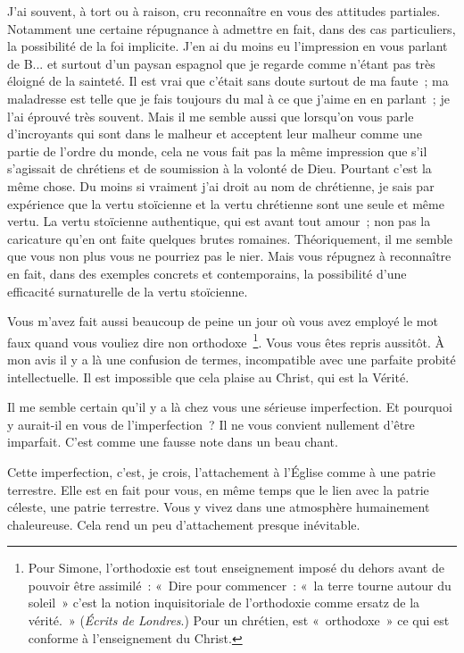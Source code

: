 \documentclass[french,twoside]{book} %
\begin{document}
J'ai souvent, à tort ou à raison, cru reconnaître en vous des attitudes partiales. Notamment une certaine répugnance à admettre en fait, dans des cas particuliers, la possibilité de la foi implicite. J'en ai du moins eu l'impression en vous parlant de B... et surtout d'un paysan espagnol que je regarde comme n'étant pas très éloigné de la sainteté. Il est vrai que c'était sans doute surtout de ma faute ; ma maladresse est telle que je fais toujours du mal à ce que j'aime en en parlant ; je l'ai éprouvé très souvent. Mais il me semble aussi que lorsqu'on vous parle d'incroyants qui sont dans le malheur et acceptent leur malheur comme une partie de l'ordre du monde, cela ne vous fait pas la même impression que s'il s'agissait de chrétiens et de soumission à la volonté de Dieu. Pourtant c'est la même chose. Du moins si vraiment j'ai droit au nom de chrétienne, je sais par expérience que la vertu stoïcienne et la vertu chrétienne sont une seule et même vertu. La vertu stoïcienne authentique, qui est avant tout amour ; non pas la caricature qu'en ont faite quelques brutes romaines. Théoriquement, il me semble que vous non plus vous ne pourriez pas le nier. Mais vous répugnez à reconnaître en fait, dans des exemples concrets et contemporains, la possibilité d'une efficacité surnaturelle de la vertu stoïcienne.\par
Vous m'avez fait aussi beaucoup de peine un jour où vous avez employé le mot faux quand vous vouliez dire non orthodoxe \footnote{ Pour Simone, l'orthodoxie est tout enseignement imposé du dehors avant de pouvoir être assimilé : « Dire pour commencer : « la terre tourne autour du soleil » c'est la notion inquisitoriale de l'orthodoxie comme ersatz de la vérité. » ({\itshape Écrits de Londres}.) Pour un chrétien, est « orthodoxe » ce qui est conforme à l'enseignement du Christ.}. Vous vous êtes repris aussitôt. À mon avis il y a là une confusion de termes, incompatible avec une parfaite probité intellectuelle. Il est impossible que cela plaise au Christ, qui est la Vérité.\par
Il me semble certain qu'il y a là chez vous une sérieuse imperfection. Et pourquoi y aurait-il en vous de l'imperfection ? Il ne vous convient nullement d'être imparfait. C'est comme une fausse note dans un beau chant.\par
Cette imperfection, c'est, je crois, l'attachement à l'Église comme à une patrie terrestre. Elle est en fait pour vous, en même temps que le lien avec la patrie céleste, une patrie terrestre. Vous y vivez dans une atmosphère humainement chaleureuse. Cela rend un peu d'attachement presque inévitable.\par
\end{document}
